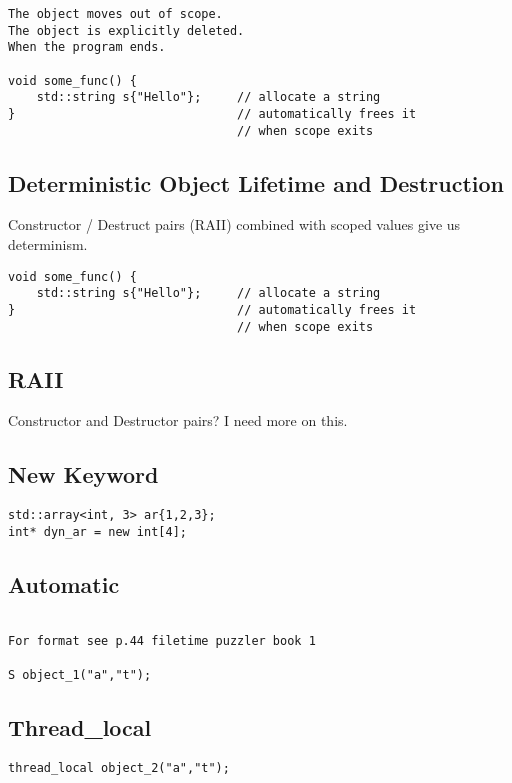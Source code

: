 \begin{verbatim}
The object moves out of scope.
The object is explicitly deleted.
When the program ends.

void some_func() {
    std::string s{"Hello"};     // allocate a string
}                               // automatically frees it
                                // when scope exits
\end{verbatim}

\subsection{Deterministic Object Lifetime and Destruction}

Constructor / Destruct pairs (RAII) combined with scoped values give us determinism.

\begin{verbatim}
void some_func() {
    std::string s{"Hello"};     // allocate a string
}                               // automatically frees it
                                // when scope exits
\end{verbatim}


\subsection{RAII}

Constructor and Destructor pairs? I need more on this.

\subsection{New Keyword}

\begin{verbatim}
std::array<int, 3> ar{1,2,3};
int* dyn_ar = new int[4];
\end{verbatim}



\subsection{Automatic}

\begin{verbatim}

For format see p.44 filetime puzzler book 1

S object_1("a","t");
\end{verbatim}

\subsection{Thread\_local}
\begin{verbatim}
thread_local object_2("a","t");
\end{verbatim}

